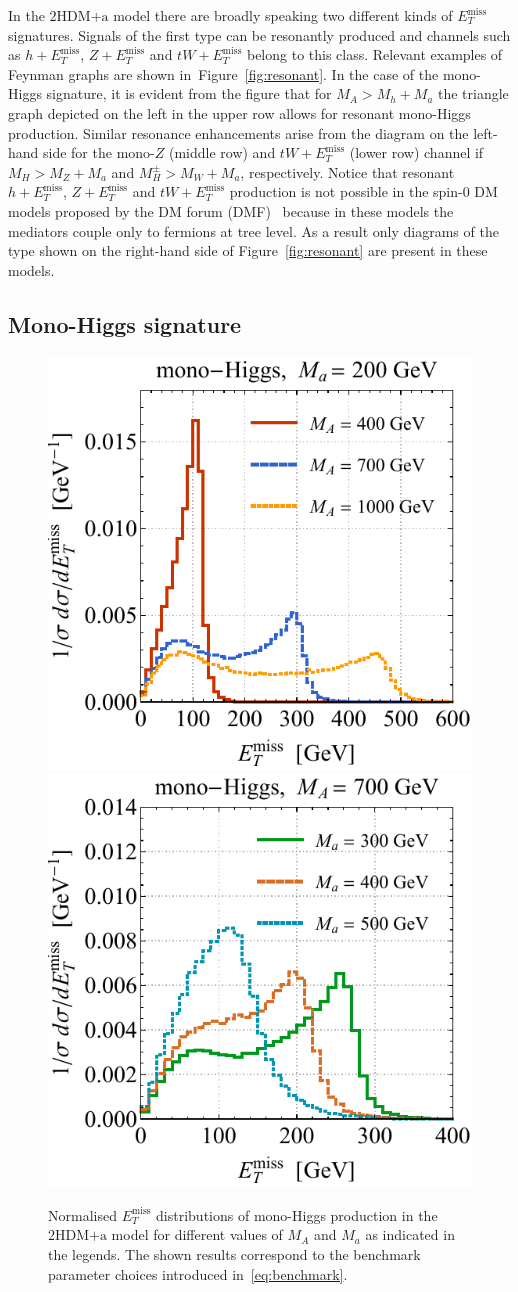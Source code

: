 \documentclass[a4paper, 11pt,notoc]{article}
\newcommand{\MET}{\ensuremath{E_T^\mathrm{miss}}\xspace}
\newcommand{\mA}{\ensuremath{M_{A}}\xspace}
\newcommand{\ma}{\ensuremath{M_{a}}\xspace}
\newcommand{\hdma}{\ensuremath{\textrm{2HDM+a}}\xspace}
\begin{document}
In the   \hdma model there are broadly speaking two different kinds of $\MET$ signatures. Signals of the first type can be resonantly produced and  channels such as $h+\MET$, $Z+ \MET$ and $tW+\MET$ belong to this class. Relevant examples of Feynman graphs are shown in~Figure~\ref{fig:resonant}. In the case of the mono-Higgs signature, it is evident from the figure that for $M_A > M_h + M_a$ the triangle  graph depicted on the left in the upper row  allows for resonant mono-Higgs production.  Similar resonance enhancements arise from the diagram on the left-hand side for the mono-$Z$ (middle row) and $tW+\MET$ (lower row) channel if $M_H > M_Z + M_a$ and $M_H^\pm > M_W + M_a$, respectively. Notice that resonant $h+\MET$, $Z+\MET$ and $tW+\MET$ production is not possible in the spin-0  DM models proposed by the DM forum (DMF)~\cite{Abercrombie:2015wmb} because in these models the mediators couple only to fermions at tree level. {\color{green} As a result only diagrams of the type shown on the right-hand side of Figure~\ref{fig:resonant} are present in  these models. }

\subsection*{Mono-Higgs signature}

\begin{figure}[t!]
\centering
\includegraphics[height=0.45\textwidth]{hmetspecl.pdf}	\qquad 
\includegraphics[height=0.45\textwidth]{hmetspecr.pdf}
\vspace{2mm}
\caption{\label{fig:hMET} Normalised $\MET$ distributions of mono-Higgs production in the \hdma model for different values of $\mA$ and $\ma$ as indicated in the legends. The shown results correspond to the benchmark parameter choices introduced in~\eqref{eq:benchmark}. }  
\end{figure}
\end{document}
